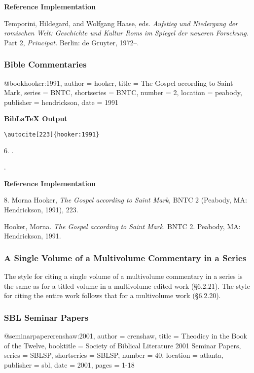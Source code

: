 \documentclass[a4paper]{article}
\newcommand\citetestns[3]{%
  {\textbf{BibLaTeX Output}\par
   \nobreak
   \texttt{\textbackslash autocite[#2]\{#3\}}\par
   \color{biblatex-colour}
   #1. \cite[#2]{#3}.\par
   \hangindent\bibindent\bibentrycite{#3}.\par}}
\newenvironment{refimp}{%
  \begin{minipage}{\linewidth}
    \setlength{\parskip}{1ex}
    \textbf{Reference Implementation}\par
    \nobreak
    \color{reference-colour}
}{\end{minipage}}
\newenvironment{vb}{%
  \setlength{\parskip}{0pt}
  \verbatim}{\endverbatim}
\begin{document}
\begin{refimp}
  \hangindent\bibindent Temporini, Hildegard, and Wolfgang Haase, eds.
  \emph{Aufstieg und Niedergang der romischen Welt: Geschichte und Kultur Roms
  im Spiegel der neueren Forschung.} Part 2, \emph{Principat.} Berlin: de
  Gruyter, 1972–.
\end{refimp}

\subsubsection{Bible Commentaries}

\begin{vb}
@book{hooker:1991,
  author = hooker,
  title = {The Gospel according to Saint Mark},
  series = BNTC,
  shortseries = {BNTC},
  number = {2},
  location = peabody,
  publisher = hendrickson,
  date = {1991}
}
\end{vb}  

\citetestns{6}{223}{hooker:1991}

\begin{refimp}
  8. Morna Hooker, \emph{The Gospel according to Saint Mark,} BNTC 2 (Peabody,
  MA: Hendrickson, 1991), 223.

  \hangindent\bibindent Hooker, Morna. \emph{The Gospel according to Saint
  Mark.} BNTC 2. Peabody, MA: Hendrickson, 1991.
\end{refimp}

\subsubsection{A Single Volume of a Multivolume Commentary in a Series}

The style for citing a single volume of a multivolume commentary in a series
is the same as for a titled volume in a multivolume edited work (§6.2.21). The
style for citing the entire work follows that for a multivolume work
(§6.2.20).

\subsubsection{SBL Seminar Papers}

\begin{vb}
@seminarpaper{crenshaw:2001,
  author = crenshaw,
  title = {Theodicy in the Book of the Twelve},
  booktitle = {Society of Biblical Literature 2001 Seminar Papers},
  series = SBLSP,
  shortseries = {SBLSP},
  number = {40},
  location = atlanta,
  publisher = sbl,
  date = {2001},
  pages = {1-18}
}
\end{vb}
\end{document}
